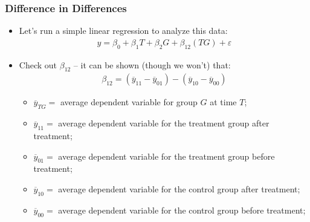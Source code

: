 \documentclass[aspectratio=169]{beamer}
\theoremstyle{principle}
\begin{document}
\begin{frame}
\frametitle{Difference in Differences}

\begin{itemize}
\item Let's run a simple linear regression to analyze this data:\huge
\begin{align*}
y = \beta_0 + \beta_1T + \beta_2G + \beta_{12}(TG) + \varepsilon
\end{align*}

\normalsize
\item Check out $\beta_{12}$ -- it can be shown (though we won't) that:
\begin{align*}
\beta_{12} = (\overline{y}_{11} - \overline{y}_{01}) - (\overline{y}_{10} - \overline{y}_{00})
\end{align*}
\begin{itemize}
\item $\overline{y}_{TG} = $ average dependent variable for group $G$ at time $T$;
\item $\overline{y}_{11} = $ average dependent variable for the treatment group after treatment;
\item $\overline{y}_{01} = $ average dependent variable for the treatment group before treatment;
\item $\overline{y}_{10} = $ average dependent variable for the control group after treatment;
\item $\overline{y}_{00} = $ average dependent variable for the control group before treatment;
\end{itemize}
\end{itemize}

\end{frame}
\end{document}
